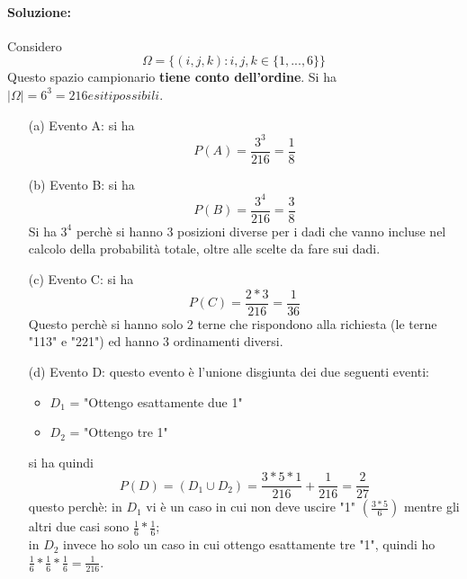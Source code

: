 \documentclass{report}
\begin{document}
\begin{enumerate}
    \paragraph{Soluzione:} Considero \[\Omega = \{(i, j, k): i, j, k \in \{1, ..., 6\}\}\] Questo spazio campionario \textbf{tiene conto dell'ordine}. Si ha \(|\Omega| = 6^3 = 216 esiti possibili\).
    \begin{itemize}
        \item [(a)] Evento A: si ha \[P(A) = \frac{3^3}{216} = \frac{1}{8}\]
        \item [(b)] Evento B: si ha \[P(B) = \frac{3^4}{216} = \frac{3}{8}\] Si ha \(3^4\) perchè si hanno 3 posizioni diverse per i dadi che vanno incluse nel calcolo della probabilità totale, oltre alle scelte da fare sui dadi.
        \item [(c)] Evento C: si ha\[P(C) = \frac{2*3}{216} = \frac{1}{36}\] Questo perchè si hanno solo 2 terne che rispondono alla richiesta (le terne "113" e "221") ed hanno 3 ordinamenti diversi.
        \item [(d)] Evento D: questo evento è l'unione disgiunta dei due seguenti eventi: \begin{itemize}
            \item \(D_1\) = "Ottengo esattamente due 1" 
            \item \(D_2\) = "Ottengo tre 1"
        \end{itemize} 
        si ha quindi \[P(D) = (D_1 \cup D_2) = \frac{3*5*1}{216} + \frac{1}{216} = \frac{2}{27}\] questo perchè: in \(D_1\) vi è un caso in cui non deve uscire "1" \((\frac{3*5}{6})\) mentre gli altri due casi sono \(\frac{1}{6}*\frac{1}{6}\);\\
        in \(D_2\) invece ho solo un caso in cui ottengo esattamente tre "1", quindi ho \(\frac{1}{6}*\frac{1}{6}*\frac{1}{6} = \frac{1}{216}\). 
    \end{itemize}
\end{enumerate}
\end{document}
